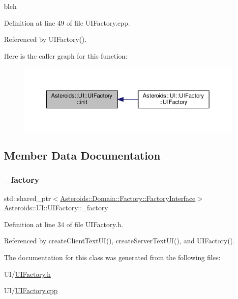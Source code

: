 bleh 

Definition at line 49 of file U\+I\+Factory.\+cpp.



Referenced by U\+I\+Factory().

Here is the caller graph for this function\+:\nopagebreak
\begin{figure}[H]
\begin{center}
\leavevmode
\includegraphics[width=350pt]{classAsteroids_1_1UI_1_1UIFactory_a4b3a29aad342a46b3ab713ca402095b6_icgraph}
\end{center}
\end{figure}


\subsection{Member Data Documentation}
\mbox{\label{classAsteroids_1_1UI_1_1UIFactory_ae8ba4636e6a333d0f57a7456e5555e9f}} 
\subsubsection{\texorpdfstring{\+\_\+factory}{\_factory}}
{\footnotesize\ttfamily std\+::shared\+\_\+ptr$<$\hyperlink{classAsteroids_1_1Domain_1_1Factory_1_1FactoryInterface}{Asteroids\+::\+Domain\+::\+Factory\+::\+Factory\+Interface}$>$ Asteroids\+::\+U\+I\+::\+U\+I\+Factory\+::\+\_\+factory\hspace{0.3cm}{\ttfamily [private]}}



Definition at line 34 of file U\+I\+Factory.\+h.



Referenced by create\+Client\+Text\+U\+I(), create\+Server\+Text\+U\+I(), and U\+I\+Factory().



The documentation for this class was generated from the following files\+:\begin{DoxyCompactItemize}
\item 
U\+I/\hyperlink{UIFactory_8h}{U\+I\+Factory.\+h}\item 
U\+I/\hyperlink{UIFactory_8cpp}{U\+I\+Factory.\+cpp}\end{DoxyCompactItemize}
